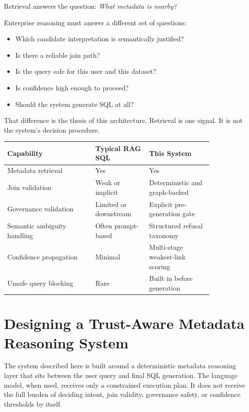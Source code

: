 \documentclass[11pt]{article}
\begin{document}
Retrieval answers the question: \emph{What metadata is nearby?}

Enterprise reasoning must answer a different set of questions:

\begin{itemize}[leftmargin=1.4em]
  \item Which candidate interpretation is semantically justified?
  \item Is there a reliable join path?
  \item Is the query safe for this user and this dataset?
  \item Is confidence high enough to proceed?
  \item Should the system generate SQL at all?
\end{itemize}

That difference is the thesis of this architecture. Retrieval is one signal. It is not the system's decision procedure.

\begin{center}
\begin{tabular}{>{\raggedright\arraybackslash}p{0.36\linewidth}>{\raggedright\arraybackslash}p{0.22\linewidth}>{\raggedright\arraybackslash}p{0.26\linewidth}}
\toprule
\textbf{Capability} & \textbf{Typical RAG SQL} & \textbf{This System} \\
\midrule
Metadata retrieval & Yes & Yes \\
Join validation & Weak or implicit & Deterministic and graph-backed \\
Governance validation & Limited or downstream & Explicit pre-generation gate \\
Semantic ambiguity handling & Often prompt-based & Structured refusal taxonomy \\
Confidence propagation & Minimal & Multi-stage weakest-link scoring \\
Unsafe query blocking & Rare & Built in before generation \\
\bottomrule
\end{tabular}
\end{center}

\section{Designing a Trust-Aware Metadata Reasoning System}

The system described here is built around a deterministic metadata reasoning layer that sits between the user query and final SQL generation. The language model, when used, receives only a constrained execution plan. It does not receive the full burden of deciding intent, join validity, governance safety, or confidence thresholds by itself.
\end{document}
